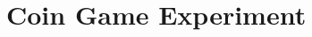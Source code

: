 \documentclass{sig-alternate}
\begin{document}

    
     
\section{Coin Game Experiment}
\end{document}
